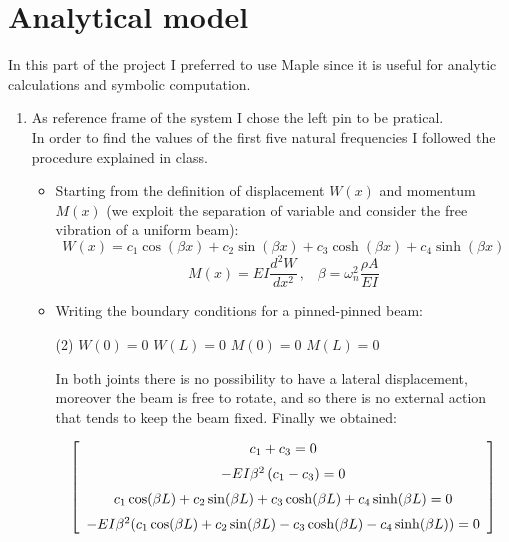 \documentclass[11pt,a4paper]{article}
\begin{document}
\section{Analytical model}
In this part of the project I preferred to use Maple since it is useful for analytic calculations and symbolic computation.

\begin{enumerate}
	\item As reference frame of the system I chose the left pin to be pratical. \\
	In order to find the values of the first five natural frequencies I followed the procedure explained in class.
	\begin{itemize}
		\item Starting from the definition of displacement $W(x)$ and momentum $M(x)$ (we exploit the separation of variable and consider the free vibration of a uniform beam):
		\begin{equation*}
			W(x)=c_1\cos(\beta x)+c_2\sin(\beta x)+c_3\cosh(\beta x)+c_4\sinh(\beta x)
		\end{equation*}
		\begin{equation*}
			M(x)=EI\frac{d^2 W}{dx^2}\,, \; \; \; \beta=\omega_n^2 {\frac{\rho A}{EI }}
		\end{equation*}
		
		\smallskip
		
		\item Writing the boundary conditions for a pinned-pinned beam:
		
		\smallskip
		
		\begin{tasks}(2)
			\task[$\rightarrow$] $W(0)=0$
			\task[$\rightarrow$] $W(L)=0$
			\task[$\rightarrow$] $M(0)=0$
			\task[$\rightarrow$] $M(L)=0$
		\end{tasks}	

		\smallskip
		
		In both joints there is no possibility to have a lateral displacement, moreover the beam is free to rotate, and so there is no external action that tends to keep the beam fixed.
		Finally we obtained:
		
		\begin{equation*}
			\left[\begin {array}{c} {c_1}+{c_3}=0 \\ 
			\noalign{\medskip}-EI{\beta}^{2} \left( {c_1}-{c_3} \right)=0 \\
			\noalign{\medskip}{c_1}\cos(\beta L)+{c_2}\sin(\beta L) +{c_3}\cosh(\beta L) +{c_4}\sinh(\beta L) =0\\
			\noalign{\medskip}-EI{\beta}^{2}({c_1}\cos(\beta L) +{c_2}\sin(\beta L)-{c_3}\cosh(\beta L)-{c_4}\sinh(\beta L))=0 \end {array} \right]		
		\end{equation*}	
		 

\end{itemize}
\end{enumerate}
\end{document}
